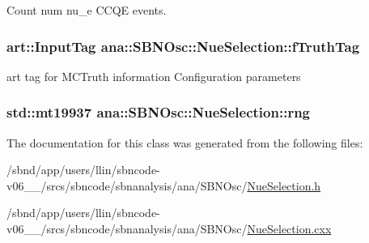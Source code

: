 Count num nu\_\-e CCQE events. \hypertarget{classana_1_1SBNOsc_1_1NueSelection_ae339e3e05a25bb103543328f4d6c62ae}{
\subsubsection[{fTruthTag}]{\setlength{\rightskip}{0pt plus 5cm}art::InputTag {\bf ana::SBNOsc::NueSelection::fTruthTag}}}
\label{classana_1_1SBNOsc_1_1NueSelection_ae339e3e05a25bb103543328f4d6c62ae}


art tag for MCTruth information Configuration parameters \hypertarget{classana_1_1SBNOsc_1_1NueSelection_aee198d69333054b12b7cb42425ca4a1e}{
\subsubsection[{rng}]{\setlength{\rightskip}{0pt plus 5cm}std::mt19937 {\bf ana::SBNOsc::NueSelection::rng}}}
\label{classana_1_1SBNOsc_1_1NueSelection_aee198d69333054b12b7cb42425ca4a1e}


The documentation for this class was generated from the following files:\begin{DoxyCompactItemize}
\item 
/sbnd/app/users/llin/sbncode-\/v06\_\_/srcs/sbncode/sbnanalysis/ana/SBNOsc/\hyperlink{NueSelection_8h}{NueSelection.h}\item 
/sbnd/app/users/llin/sbncode-\/v06\_\_/srcs/sbncode/sbnanalysis/ana/SBNOsc/\hyperlink{NueSelection_8cxx}{NueSelection.cxx}\end{DoxyCompactItemize}
